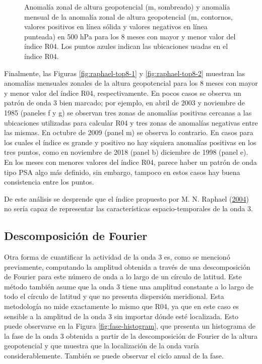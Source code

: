 \documentclass[12pt,oneside,a4paper]{reedthesis}
\begin{document}
\begin{figure}
{}

\caption{Anomalía zonal de altura geopotencial (m, sombreado) y anomalía mensual de la anomalía zonal de altura geopotencial (m, contornos, valores positivos en línea sólida y valores negativos en línea punteada) en 500 hPa para los 8 meses con mayor y menor valor del índice R04. Los puntos azules indican las ubicaciones usadas en el índice R04.}\label{fig:raphael-top8}
\end{figure}



Finalmente, las Figuras \ref{fig:raphael-top8-1} y \ref{fig:raphael-top8-2} muestran las anomalías mensuales zonales de la altura geopotencial para los 8 meses con mayor y menor valor del índice R04, respectivamente.
En pocos casos se observa un patrón de onda 3 bien marcado; por ejemplo, en abril de 2003 y noviembre de 1985 (paneles f y g) se observan tres zonas de anomalías positivas cercanas a las ubicaciones utilizadas para calcular R04 y tres zonas de anomalías negativas entre las mismas.
En octubre de 2009 (panel m) se observa lo contrario.
En casos para los cuales el índice es grande y positivo no hay siquiera anomalías positivas en los tres puntos, como en noviembre de 2018 (panel b) diciembre de 1998 (panel e).
En los meses con menores valores del índice R04, parece haber un patrón de onda tipo PSA algo más definido, sin embargo, tampoco en estos casos hay buena consistencia entre los puntos.

De este análisis se desprende que el índice propuesto por M. N. Raphael (\protect\hyperlink{ref-raphael2004}{2004}) no sería capaz de representar las características espacio-temporales de la onda 3.

\hypertarget{descomposiciuxf3n-de-fourier}{%
\subsection{Descomposición de Fourier}\label{descomposiciuxf3n-de-fourier}}

Otra forma de cuantificar la actividad de la onda 3 es, como se mencionó previamente, computando la amplitud obtenida a través de una descomposición de Fourier para este número de onda a lo largo de un círculo de latitud.
Este método también asume que la onda 3 tiene una amplitud constante a lo largo de todo el círculo de latitud y que no presenta dispersión meridional.
Esta metodología no mide exactamente lo mismo que R04, ya que en este caso es sensible a la amplitud de la onda 3 sin importar dónde esté localizada.
Esto puede observarse en la Figura \ref{fig:fase-histogram}, que presenta un histograma de la fase de la onda 3 obtenida a partir de la descomposición de Fourier de la altura geopotencial y que muestra que la localización de la onda varía considerablemente.
También se puede observar el ciclo anual de la fase.
\end{document}

